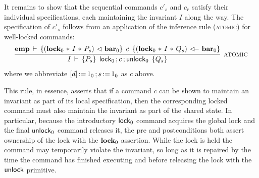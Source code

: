 \documentclass[11pt]{report}
\begin{document}
It remains to show that the sequential commands $c'_s$ and $c_r$ satisfy their individual specifications, each maintaining the invariant $I$ along the way. The specification of $c'_s$ follows from an application of the inference rule (\textsc{atomic}) for well-locked commands: \[ \infer[\textsc{atomic}]{\spec{I}{P_s}{\clock_0 \opseq c \opseq \cunlock_0}{Q_s} }{\spec{\femp}{(\flock{0} \fsep I \fsep P_s) \fseq \fbar{0}}{c}{(\flock{0} \fsep I \fsep Q_s) \fseqri \fbar{0}}}\] where we abbreviate $\left[ d \right] \operatorname{:\!=} 1_0 \operatorname{;} s \operatorname{:\!=} 1_0$ as $c$ above. 

This rule, in essence, asserts that if a command $c$ can be shown to maintain an invariant as part of its local specification, then the corresponding locked command must also maintain the invariant as part of the shared state. In particular, because the introductory $\operatorname{\mathsf{lock}}_0$ command acquires the global lock and the final $\operatorname{\mathsf{unlock}}_0$ command releases it, the pre and postconditions both assert ownership of the lock with the $\mathbf{lock}_{0}$ assertion. While the lock is held the command may temporarily violate the invariant, so long as it is repaired by the time the command has finished executing and before releasing the lock with the $\operatorname{\mathsf{unlock}}$ primitive. 
\end{document}
